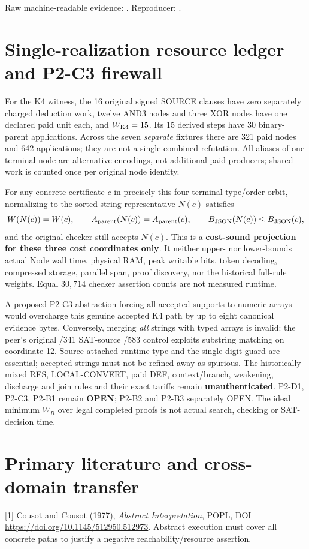\documentclass[11pt]{article}
\begin{document}
\noindent Raw machine-readable evidence: .
Reproducer: .

\section*{Single-realization resource ledger and P2-C3 firewall}
For the K4 witness, the 16 original signed SOURCE clauses have zero separately charged deduction work, twelve AND3 nodes and three XOR nodes have one declared paid unit each, and $W_{\rm K4}=15$. Its 15 derived steps have 30 binary-parent applications. Across the seven \emph{separate} fixtures there are 321 paid nodes and 642 applications; they are not a single combined refutation. All aliases of one terminal node are alternative encodings, not additional paid producers; shared work is counted once per original node identity.

For any concrete certificate $c$ in precisely this four-terminal type/order orbit, normalizing to the sorted-string representative $N(c)$ satisfies
\[
W(N(c))=W(c),\qquad A_{\rm parent}(N(c))=A_{\rm parent}(c),\qquad B_{\rm JSON}(N(c))\le B_{\rm JSON}(c),
\]
and the original checker still accepts $N(c)$. This is a \textbf{cost-sound projection for these three cost coordinates only}. It neither upper- nor lower-bounds actual Node wall time, physical RAM, peak writable bits, token decoding, compressed storage, parallel span, proof discovery, nor the historical full-rule weights. Equal $30{,}714$ checker assertion counts are not measured runtime.

A proposed P2-C3 abstraction forcing all accepted supports to numeric arrays would overcharge this genuine accepted K4 path by up to eight canonical evidence bytes. Conversely, merging \emph{all} strings with typed arrays is invalid: the peer's original /341 SAT-source /583 control exploits substring matching on coordinate 12. Source-attached runtime type and the single-digit guard are essential; accepted strings must not be refined away as spurious. The historically mixed RES, LOCAL-CONVERT, paid DEF, context/branch, weakening, discharge and join rules and their exact tariffs remain \textbf{unauthenticated}. P2-D1, P2-C3, P2-B1 remain \textbf{OPEN}; P2-B2 and P2-B3 separately OPEN. The ideal minimum $W_R$ over legal completed proofs is not actual search, checking or SAT-decision time.

\section*{Primary literature and cross-domain transfer}
[1] Cousot and Cousot (1977), \emph{Abstract Interpretation}, POPL, DOI \url{https://doi.org/10.1145/512950.512973}. Abstract execution must cover all concrete paths to justify a negative reachability/resource assertion.
\end{document}
